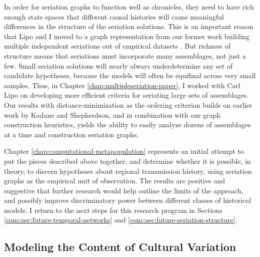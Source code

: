 In order for seriation graphs to function well as chronicles, they need to have rich enough state spaces that different causal histories will cause meaningful differences in the structure of the seriation solutions.  This is an important reason that Lipo and I moved to a graph representation from our former work building multiple independent seriations out of empirical datasets \citep{Lipo2015}.  But richness of structure means that seriations must incorporate many assemblages, not just a few.  Small seriation solutions will nearly always underdetermine any set of candidate hypotheses, because the models will often be equifinal across very small samples.  Thus, in Chapter \ref{chap:multipleseriation-paper}, I worked with Carl Lipo on developing more efficient criteria for seriating large sets of assemblages.  Our results with distance-minimization as the ordering criterion builds on earlier work by Kadane and Shepherdson, and in combination with our graph construction heuristics, yields the ability to easily analyze dozens of assemblages at a time and construction seriation graphs.  

Chapter \ref{chap:computational-metapopulation} represents an initial attempt to put the pieces described above together, and determine whether it is possible, in theory, to discern hypotheses about regional transmission history, using seriation graphs as the empirical unit of observation.  The results are positive and suggestive that further research would help outline the limits of the approach, and possibly improve discriminatory power between different classes of historical models.  I return to the next steps for this research program in Sections \ref{conc:sec:future-temporal-networks} and \ref{conc:sec:future-seriation-structure}.   

\subsection{Modeling the Content of Cultural Variation}\label{conc:sec:conc-structured}

